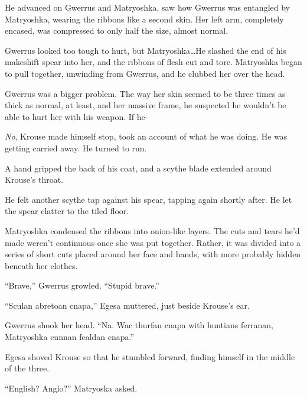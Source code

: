 He advanced on Gwerrus and Matryoshka, saw how Gwerrus was entangled by Matryoshka, wearing the ribbons like a second skin.  Her left arm, completely encased, was compressed to only half the size, almost normal.



Gwerrus looked too tough to hurt, but Matryoshka\ldots  He slashed the end of his makeshift spear into her, and the ribbons of flesh cut and tore.  Matryoshka began to pull together, unwinding from Gwerrus, and he clubbed her over the head.



Gwerrus was a bigger problem.  The way her skin seemed to be three times as thick as normal, at least, and her massive frame, he suspected he wouldn't be able to hurt her with his weapon.  If he-



\emph{No}, Krouse made himself stop, took an account of what he was doing.  He was getting carried away.  He turned to run.



A hand gripped the back of his coat, and a scythe blade extended around Krouse's throat.



He felt another scythe tap against his spear, tapping again shortly after.  He let the spear clatter to the tiled floor.



Matryoshka condensed the ribbons into onion-like layers. The cuts and tears he'd made weren't continuous once she was put together.  Rather, it was divided into a series of short cuts placed around her face and hands, with more probably hidden beneath her clothes.



``Brave,'' Gwerrus growled.  ``Stupid brave.''



``Sculan abretoan cnapa,'' Egesa muttered, just beside Krouse's ear.



Gwerrus shook her head.  ``Na.  Wac thurfan cnapa with huntians ferranan, Matryoshka cunnan fealdan cnapa.''



Egesa shoved Krouse so that he stumbled forward, finding himself in the middle of the three.



``English?  Anglo?''  Matryoska asked.



